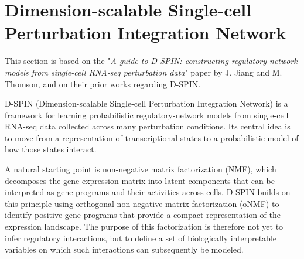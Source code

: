 \documentclass[11pt,a4paper]{article}
\begin{document}
%
%
%
%


\section{Dimension-scalable Single-cell Perturbation Integration Network}

This section is based on the "\textit{A guide to D-SPIN: constructing regulatory network models from single-cell RNA-seq perturbation data}" paper by J. Jiang and M. Thomson, and on their prior works regarding D-SPIN.

D-SPIN (Dimension-scalable Single-cell Perturbation Integration Network) is a framework for learning probabilistic regulatory-network models from single-cell RNA-seq data collected across many perturbation conditions. Its central idea is to move from a representation of transcriptional states to a probabilistic model of how those states interact. 

A natural starting point is non-negative matrix factorization (NMF), which decomposes the gene-expression matrix into latent components that can be interpreted as gene programs and their activities across cells. D-SPIN builds on this principle using orthogonal non-negative matrix factorization (oNMF) to identify positive gene programs that provide a compact representation of the expression landscape. The purpose of this factorization is therefore not yet to infer regulatory interactions, but to define a set of biologically interpretable variables on which such interactions can subsequently be modeled. 
\end{document}
